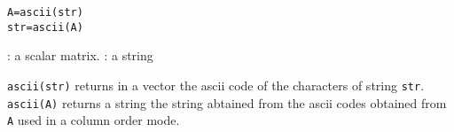 
\begin{mandesc}
\end{mandesc}

\begin{calling_sequence}
\begin{verbatim}
A=ascii(str)  
str=ascii(A)  
\end{verbatim}
\end{calling_sequence}

\begin{parameters}
  \begin{varlist}
    : a scalar matrix.
    : a string
  \end{varlist}
\end{parameters}
\begin{mandescription}
  \verb+ascii(str)+ returns in a vector the ascii code of the characters of 
  string \verb+str+. 
  \verb+ascii(A)+ returns a string the string abtained from the ascii codes 
  obtained from \verb+A+ used in a column order mode. 
\end{mandescription}

